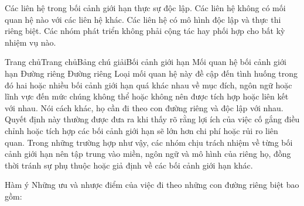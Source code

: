 
Các liên hệ trong bối cảnh giới hạn thực sự độc lập.
Các liên hệ không có mối quan hệ nào với các liên hệ khác.
Các liên hệ có mô hình độc lập và thực thi riêng biệt.
Các nhóm phát triển không phải cộng tác hay phối hợp cho bất kỳ nhiệm vụ nào.



Trang chủTrang chủBảng chú giảiBối cảnh giới hạn Mối quan hệ bối cảnh giới hạn Đường riêng
Đường riêng
Loại mối quan hệ này đề cập đến tình huống trong đó hai hoặc nhiều bối cảnh giới hạn quá khác nhau về mục đích, ngôn ngữ hoặc lĩnh vực đến mức chúng không thể hoặc không nên được tích hợp hoặc liên kết với nhau. Nói cách khác, họ cần đi theo con đường riêng và độc lập với nhau. Quyết định này thường được đưa ra khi thấy rõ rằng lợi ích của việc cố gắng điều chỉnh hoặc tích hợp các bối cảnh giới hạn sẽ lớn hơn chi phí hoặc rủi ro liên quan. Trong những trường hợp như vậy, các nhóm chịu trách nhiệm về từng bối cảnh giới hạn nên tập trung vào miền, ngôn ngữ và mô hình của riêng họ, đồng thời tránh sự phụ thuộc hoặc giả định về các bối cảnh giới hạn khác.

Hàm ý
Những ưu và nhược điểm của việc đi theo những con đường riêng biệt bao gồm:

